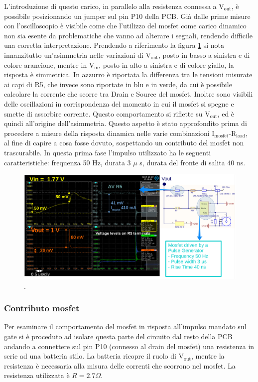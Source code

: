 L'introduzione di questo carico, in parallelo alla resistenza connessa a $\mathrm{V_{out}}$, è possibile posizionando un jumper sul pin P10 della PCB. Già dalle prime misure con l'oscilloscopio è visibile come che l'utilizzo del mosfet come carico dinamico non sia esente da problematiche che vanno ad alterare i segnali, rendendo difficile una corretta interpretazione. 
Prendendo a riferimento la figura \ref{TransientTest} si nota innanzitutto un'asimmetria nelle variazioni di $\mathrm{V_{out}}$, posto in basso a sinistra e di colore arancione, mentre in $\mathrm{V_{in}}$, posto in alto a sinistra e di colore giallo, la risposta è simmetrica. In azzurro è riportata la differenza tra le tensioni misurate ai capi di R5, che invece sono riportate in blu e in verde, da cui è possibile calcolare la corrente che scorre tra Drain e Source del mosfet. 
Inoltre sono visibili delle oscillazioni in corrispondenza del momento in cui il mosfet si spegne e smette di assorbire corrente. Questo comportamento si riflette su $\mathrm{V_{out}}$, ed è quindi all'origine dell'asimmetria. Questo aspetto è stato approfondito prima di procedere a misure della risposta dinamica nelle varie combinazioni $\mathrm{I_{mosfet}}$-$\mathrm{R_{load}}$, al fine di capire a cosa fosse dovuto, sospettando un contributo del mosfet non trascurabile.
In questa prima fase l'impulso utilizzato ha le seguenti caratteristiche: frequenza 50 Hz, durata 3 $\mu$ s, durata del fronte di salita 40 ns.
\begin{figure}
\centering
\includegraphics[scale=.2]{Immagini/TransientTest}
\caption{.}
\label{TransientTest}
\end{figure}

\subsubsection{Contributo mosfet}
Per esaminare il comportamento del mosfet in risposta all'impulso mandato sul gate si è proceduto ad isolare questa parte del circuito dal resto della PCB andando a connettere sul pin P10 (connesso al drain del mosfet) una resistenza in serie ad una batteria stilo. La batteria ricopre il ruolo di $\mathrm{V_{out}}$, mentre la resistenza è necessaria alla misura delle correnti che scorrono nel mosfet. La resistenza utilizzata è $R=2.7 \Omega$. 

